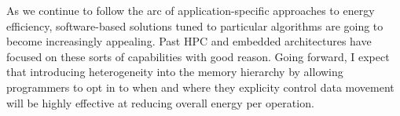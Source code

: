 As we continue to follow the arc of application-specific approaches to energy efficiency,
software-based solutions tuned to particular algorithms are going to become increasingly appealing.
Past HPC and embedded architectures have focused on these sorts of capabilities with good reason.
Going forward, I expect that
introducing heterogeneity into the memory hierarchy by allowing programmers to opt in to
when and where they explicity control data movement will be highly effective at
reducing overall energy per operation.
